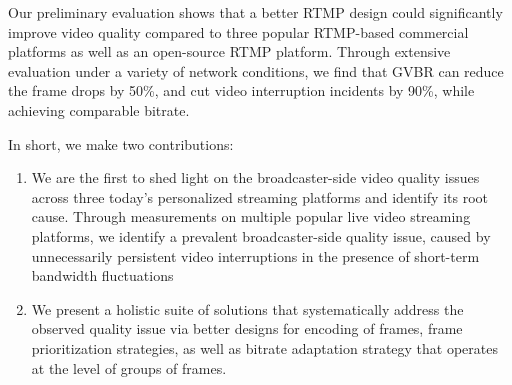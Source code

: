 Our preliminary evaluation shows that a better RTMP design
could significantly improve video quality compared to three popular
RTMP-based commercial  platforms as well as an open-source
RTMP platform.
Through extensive evaluation under a variety of network conditions, we find that 
GVBR can reduce the frame drops by 50\%, and cut video interruption incidents 
by 90\%, while achieving comparable bitrate.




In short, we make two contributions:
\begin{enumerate}
\item We are the first to shed light on the broadcaster-side video 
quality issues across three today's personalized streaming platforms and 
identify its root cause.
Through measurements on multiple popular live video streaming platforms, 
we identify a prevalent broadcaster-side quality issue, caused
by unnecessarily persistent video interruptions in the presence of short-term
bandwidth fluctuations
\item We present a holistic suite of solutions that systematically address
the observed quality issue via better designs for encoding of frames, 
frame prioritization strategies, as well as bitrate adaptation strategy that 
operates at the level of groups of frames.

\end{enumerate}


